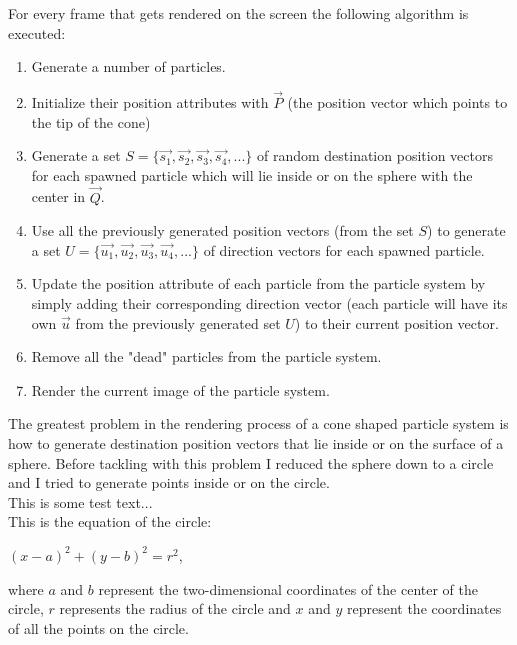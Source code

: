 For every frame that gets rendered on the screen the following algorithm is executed:

\begin{enumerate}
	\item Generate a number of particles.
	
	\item Initialize their position attributes with $\vec{P}$ (the position vector which points to the tip of the cone)
	
	\item Generate a set $S = \{\vec{s_1}, \vec{s_2}, \vec{s_3}, \vec{s_4}, ...\}$ of random destination position vectors for each spawned particle which will lie inside or on the sphere with the center in $\vec{Q}$.
	
	\item Use all the previously generated position vectors (from the set $S$) to generate a set $U = \{\vec{u_1}, \vec{u_2}, \vec{u_3}, \vec{u_4}, ...\}$ of direction vectors for each spawned particle.
	
	\item Update the position attribute of each particle from the particle system by simply adding their corresponding direction vector (each particle will have its own $\vec{u}$ from the previously generated set $U$) to their current position vector.
	
	\item Remove all the "dead" particles from the particle system.
	
	\item Render the current image of the particle system.
\end{enumerate}
\newpage
The greatest problem in the rendering process of a cone shaped particle system is how to generate destination position vectors that lie inside or on the surface of a sphere. Before tackling with this problem I reduced the sphere down to a circle and I tried to generate points inside or on the circle.\\

This is some test text...\\

This is the equation of the circle:
\begin{center}
	$(x - a) ^ 2 + (y - b) ^ 2 = r ^ 2$,
\end{center}

where $a$ and $b$ represent the two-dimensional coordinates of the center of the circle, $r$ represents the radius of the circle and $x$ and $y$ represent the coordinates of all the points on the circle.\\


